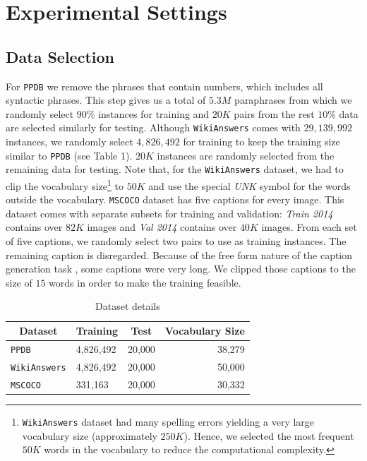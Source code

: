  
 
\section{Experimental Settings}
\subsection{Data Selection}
For \texttt{PPDB} we remove the phrases that contain numbers, which includes all syntactic phrases. This step gives us a total of $5.3M$ paraphrases from which we randomly select $90\%$ instances for training and $20K$ pairs from the rest $10\%$ data are selected similarly for testing. Although \texttt{WikiAnswers} comes with $29,139,992$ instances, we randomly select $4,826,492$ for training to keep the training size similar to \texttt{PPDB} (see Table 1). $20K$ instances are randomly selected from the remaining data for testing. Note that, for the \texttt{WikiAnswers} dataset, we had to clip the vocabulary size\footnote{\texttt{WikiAnswers} dataset had many spelling errors yielding a very large vocabulary size (approximately $250K$). Hence, we selected the most frequent $50K$ words in the vocabulary to reduce the computational complexity.} to $50K$ and use the special \emph{UNK} symbol for the words outside the vocabulary. \texttt{MSCOCO} dataset has five captions for every image. This dataset comes with separate subsets for training and validation: \emph{Train 2014} contains over $82K$ images and \emph{Val 2014} contains over $40K$ images. From each set of five captions, we randomly select two pairs to use as training instances. The remaining caption is disregarded. Because of the free form nature of the caption generation task \cite{VinyalsTBE14}, some captions were very long. We clipped those captions to the size of $15$ words in order to make the training feasible.

\begin{table}
      \centering
    \begin{tabular}{lllr}
    \midrule
    \multicolumn{1}{c}{\textbf{Dataset}} & \multicolumn{1}{c}{\textbf{Training}} & \multicolumn{1}{c}{\textbf{Test}} & \multicolumn{1}{c}{\textbf{Vocabulary Size}}\\
    \midrule
    \texttt{PPDB}                        & 4,826,492                    & 20,000         & 38,279          \\
    \texttt{WikiAnswers}                 & 4,826,492                    & 20,000         & 50,000          \\
    \texttt{MSCOCO}                      & 331,163                      & 20,000         & 30,332         \\
    \midrule
    \end{tabular}
     \caption{Dataset details}
\end{table}

